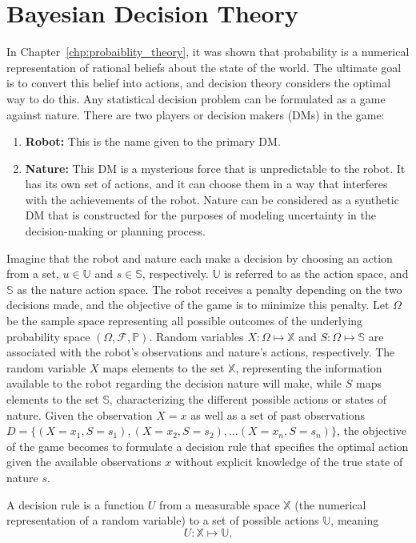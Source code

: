 \chapter{Bayesian Decision Theory}
In Chapter~\ref{chp:probaiblity_theory}, it was shown that probability is a numerical representation of rational beliefs about the state of the world. The ultimate goal is to convert this belief into actions, and decision theory considers the optimal way to do this. Any statistical decision problem can be formulated as a game against nature. There are two players or decision makers (DMs) in the game:
\begin{enumerate}
	\item \textbf{Robot:} This is the name given to the primary DM.
	
	\item \textbf{Nature:} This DM is a mysterious force that is unpredictable to the robot. It has its own set of actions, and it can choose them in a way that interferes with the achievements of the robot. Nature can be considered as a synthetic DM that is constructed for the purposes of modeling uncertainty in the decision-making or planning process.
\end{enumerate}

Imagine that the robot and nature each make a decision by choosing an action from a set, $u \in \mathbb{U}$ and $s \in \mathbb{S}$, respectively. $\mathbb{U}$ is referred to as the action space, and $\mathbb{S}$ as the nature action space. The robot receives a penalty depending on the two decisions made, and the objective of the game is to minimize this penalty. Let $\Omega$ be the sample space representing all possible outcomes of the underlying probability space $(\Omega, \mathcal{F},\mathbb{P})$. Random variables $X: \Omega \mapsto \mathbb{X}$ and $S: \Omega \mapsto \mathbb{S}$ are associated with the robot's observations and nature's actions, respectively. The random variable $X$ maps elements to the set $\mathbb{X}$, representing the information available to the robot regarding the decision nature will make, while $S$ maps elements to the set $\mathbb{S}$, characterizing the different possible actions or states of nature. Given the observation $X=x$ as well as a set of past observations $D= \{(X=x_1,S=s_1),(X=x_2,S=s_2),\dots (X=x_n,S=s_n)\}$, the objective of the game becomes to formulate a decision rule that specifies the optimal action given the available observations $x$ without explicit knowledge of the true state of nature $s$.
\begin{definition}
	\label{def:decision_rule}
	A decision rule is a function $U$ from a measurable space $\mathbb{X}$ (the numerical representation of a random variable) to a set of possible actions $\mathbb{U}$, meaning
	\begin{equation}
		U: \mathbb{X} \mapsto \mathbb{U}.
	\end{equation}
\end{definition}


